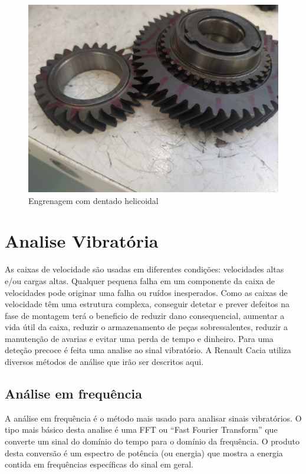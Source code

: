 \begin{figure}[H]
\centering
\includegraphics[scale=0.1]{figs/dentado_heli}
\caption{Engrenagem com dentado helicoidal}\label{dentado_helicoidal}
\end{figure}


\section{Analise Vibratória}\label{Analise Vibratória}
As caixas de velocidade são usadas em diferentes condições: velocidades altas e/ou cargas altas. Qualquer pequena falha em um componente da caixa de velocidades pode originar uma falha ou ruídos inesperados. Como as caixas de velocidade têm uma estrutura complexa, conseguir detetar e prever defeitos na fase de montagem terá o beneficio de reduzir dano consequencial, aumentar a vida útil da caixa, reduzir o armazenamento de peças sobressalentes, reduzir a manutenção de avarias e evitar uma perda de tempo e dinheiro. Para uma deteção precoce é feita uma analise ao sinal vibratório. A Renault Cacia utiliza diversos métodos de análise que irão ser descritos aqui.


\subsection{Análise em frequência}
A análise em frequência é o método mais usado para analisar sinais vibratórios. O tipo mais básico desta analise é uma FFT ou ``Fast Fourier Transform'' que converte um sinal do domínio do tempo para o domínio da frequência. O produto desta conversão é um espectro de potência (ou energia) que mostra a energia contida em frequências específicas do sinal em geral.

